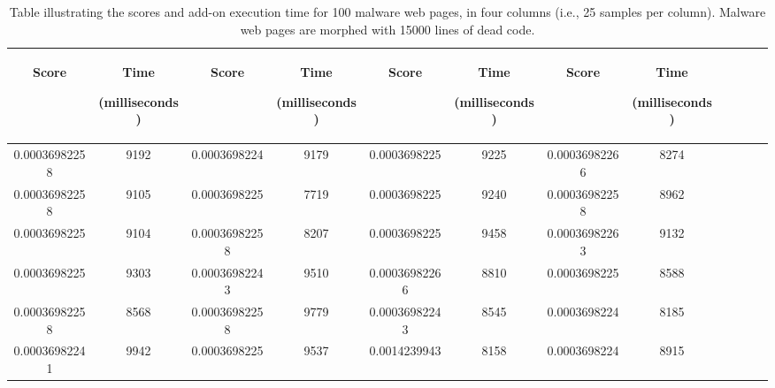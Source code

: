 \begin{table}[h]
\caption[Scores table of malware web pages]{Table illustrating the scores and add-on execution time for 100 malware web pages, in four columns (i.e., 25 samples per column). Malware web pages are morphed with 15000 lines of dead code. }
    \label{tab:m15000table}
  \centering
  \begin{tabular}{|c|c|c|c|c|c|c|c|c|c|c|c|} 
  \midrule
 \begin{sideways}Score\end{sideways}& \begin{sideways}Time\end{sideways} \begin{sideways} (milliseconds)\end{sideways}& \begin{sideways}Score\end{sideways}& \begin{sideways}Time\end{sideways}  \begin{sideways}(milliseconds)\end{sideways}& \begin{sideways}Score\end{sideways}& \begin{sideways}Time\end{sideways}  \begin{sideways}(milliseconds)\end{sideways}& \begin{sideways}Score\end{sideways}& \begin{sideways}Time\end{sideways}  \begin{sideways} (milliseconds)\end{sideways}\\
\midrule
0.00036982258&9192&0.0003698224&9179&0.0003698225&9225&0.00036982266&8274\\
\midrule
0.00036982258&9105&0.0003698225&7719&0.0003698225&9240&0.00036982258&8962\\
\midrule
0.0003698225&9104&0.00036982258&8207&0.0003698225&9458&0.00036982263&9132\\
\midrule
0.0003698225&9303&0.00036982243&9510&0.00036982266&8810&0.0003698225&8588\\
\midrule
0.00036982258&8568&0.00036982258&9779&0.00036982243&8545&0.0003698224&8185\\
\midrule
0.00036982241&9942&0.0003698225&9537&0.0014239943&8158&0.0003698224&8915\\

\end{tabular}
\end{table}

